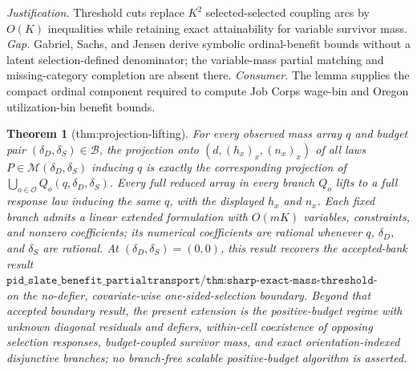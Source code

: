 \documentclass{article}
\newtheorem{theorem}{Theorem}
\begin{document}
\par\smallskip\noindent \textit{Justification.} Threshold cuts replace \(K^2\) selected-selected coupling arcs by \(O(K)\) inequalities while retaining exact attainability for variable survivor mass. \textit{Gap.} Gabriel, Sachs, and Jensen derive symbolic ordinal-benefit bounds without a latent selection-defined denominator; the variable-mass partial matching and missing-category completion are absent there. \textit{Consumer.} The lemma supplies the compact ordinal component required to compute Job Corps wage-bin and Oregon utilization-bin benefit bounds.

\begin{theorem}[thm:projection-lifting]\label{thm:projection-lifting}
For every observed mass array \(q\) and budget pair \((\delta_D,\delta_S)\in\mathcal B\), the projection onto \((d,(h_x)_x,(n_x)_x)\) of all laws \(P\in\mathcal M(\delta_D,\delta_S)\) inducing \(q\) is exactly the corresponding projection of \(\bigcup_{o\in\mathcal O}Q_o(q,\delta_D,\delta_S)\). Every full reduced array in every branch \(Q_o\) lifts to a full response law inducing the same \(q\), with the displayed \(h_x\) and \(n_x\). Each fixed branch admits a linear extended formulation with \(O(mK)\) variables, constraints, and nonzero coefficients; its numerical coefficients are rational whenever \(q\), \(\delta_D\), and \(\delta_S\) are rational. At \((\delta_D,\delta_S)=(0,0)\), this result recovers the accepted-bank result \(\texttt{pid\_slate\_benefit\_partialtransport/thm:sharp-exact-mass-threshold-interval}\) on the no-defier, covariate-wise one-sided-selection boundary. Beyond that accepted boundary result, the present extension is the positive-budget regime with unknown diagonal residuals and defiers, within-cell coexistence of opposing selection responses, budget-coupled survivor mass, and exact orientation-indexed disjunctive branches; no branch-free scalable positive-budget algorithm is asserted.
\end{theorem}
\end{document}
